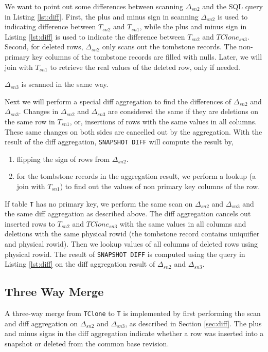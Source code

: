 \documentclass[sigconf,nonacm]{acmart} %
\begin{document}
We want to point out some differences between scanning $\Delta_{sn2}$
and the SQL query in Listing \ref{lst:diff}.  
First, the plus and minus sign in scanning $\Delta_{sn2}$ 
is used to indicating difference between $T_{sn2}$ and $T_{sn1}$, 
while the plus and minus sign in Listing \ref{lst:diff} is used to 
indicate the difference between $T_{sn2}$ and $TClone_{sn3}$.
Second, for deleted rows, $\Delta_{sn2}$ only scans out the 
tombstone records.  The non-primary key columns of the tombstone records 
are filled with nulls.  Later, we will join with $T_{sn1}$ to retrieve
the real values of the deleted row, only if needed.

$\Delta_{sn3}$ is scanned in the same way.

Next we will perform a special diff aggregation to find the differences
of $\Delta_{sn2}$ and $\Delta_{sn3}$.  Changes in $\Delta_{sn2}$ 
and $\Delta_{sn3}$ are considered the same if they are deletions 
on the same row in $T_{sn1}$, or, insertions of rows with the same 
values in all columns.  These same changes on both sides are 
cancelled out by the aggregation.  With the result of the diff aggregation,
\texttt{SNAPSHOT DIFF} will compute the result by,
\begin{enumerate}
\item flipping the sign of rows from $\Delta_{sn2}$. 
\item for the tombstone records in the aggregation result, we perform 
a lookup (a join with $T_{sn1}$) to find out the values of non primary 
key columns of the row.
\end{enumerate}

If table \texttt{T} has no primary key, we perform the same scan on 
$\Delta_{sn2}$ and $\Delta_{sn3}$ and the same diff aggregation as described 
above.  The diff aggregation cancels out inserted rows to $T_{sn2}$ and 
$TClone_{sn3}$ with the same values in all columns and deletions 
with the same physical rowid (the tombstone record contains uniquifier and physical rowid).  
Then we lookup values of all columns of deleted rows using physical rowid.
The result of \texttt{SNAPSHOT DIFF} is computed using the query in 
Listing \ref{lst:diff} on the diff aggregation result of $\Delta_{sn2}$ and $\Delta_{sn3}$.

\subsection{Three Way Merge} \label{sec:threewaymerge}
A three-way merge from \texttt{TClone} to \texttt{T} is implemented by first 
performing the scan and diff aggregation on $\Delta_{sn2}$ and $\Delta_{sn3}$, 
as described in Section \ref{sec:diff}. The plus and minus signs in the diff 
aggregation indicate whether a row was inserted into a snapshot or deleted from the
common base revision. 
\end{document}
